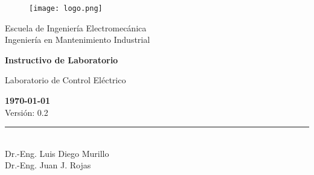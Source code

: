 \documentclass[12pt,letterpaper]{report}
\newcommand{\escuela}{Escuela de Ingeniería Electromecánica}
\newcommand{\programa}{Ingeniería en Mantenimiento Industrial}
\newcommand{\curso}{Laboratorio de Control Eléctrico}
\begin{document}
\begin{titlepage}

\begin{center}
\vspace*{1in}
\begin{figure}[htb]
\begin{center}
\texttt{[image: logo.png]}
\end{center}
\end{figure}
\vspace*{0.4in}
\begin{Large}
\escuela\\
\vspace*{0.15in}
\programa\\
\vspace*{0.8in}
\end{Large}
\vspace*{0.2in}
\begin{Large}
\textbf{Instructivo de Laboratorio} \\
\end{Large}
\vspace*{0.3in}
\begin{large}
\curso\\
\end{large}
\vspace*{2.5in}
\begin{tiny}
\textbf{\today}\\
Versión: 0.2\\
\end{tiny}
\rule{60mm}{0.1mm}\\
\vspace*{0.1 in}
Dr.-Eng. Luis Diego Murillo \\
Dr.-Eng. Juan J. Rojas
\end{center}

\end{titlepage}

\tableofcontents



% 







\appendix







\end{document}
